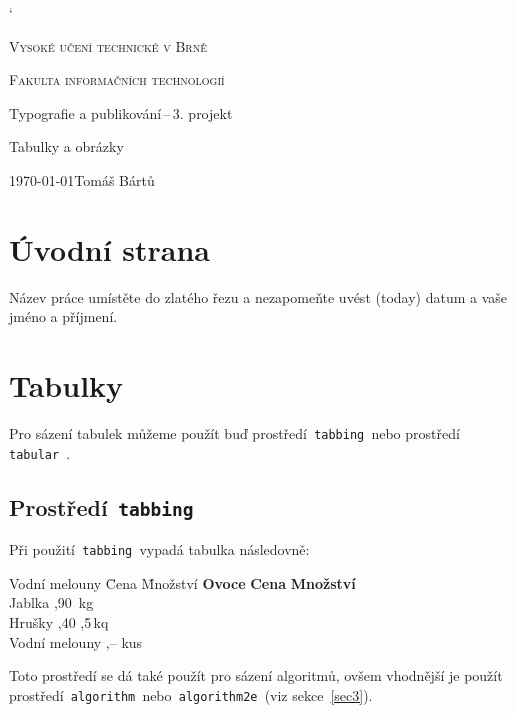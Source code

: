 \documentclass[a4paper,11pt]{article}[20-03-2022]
\begin{document}
\catcode`
\color{red}
\begin{titlepage}
    \begin{center}
        \Huge \textsc{Vysoké učení technické v Brně}

        \huge \textsc{Fakulta informačních technologií}


        \LARGE Typografie a publikování\,--\,3. projekt

        \Huge Tabulky a obrázky

    \end{center}
    {\Large \today \hfill Tomáš Bártů}    
\end{titlepage}

\section{Úvodní strana}
Název práce umístěte do zlatého řezu a nezapomeňte uvést     (today) datum a vaše jméno a příjmení.

\section{Tabulky}
Pro sázení tabulek můžeme použít buď prostředí\texttt{ tabbing }nebo prostředí\texttt{ tabular }.

\subsection{Prostředí\texttt{ tabbing }}
Při použití\texttt{ tabbing }vypadá tabulka následovně:
\begin{tabbing}
    Vodní melouny \quad \= Cena \quad \= Množství \kill
    \textbf{Ovoce}      \> \textbf{Cena} \> \textbf{Množství}\\
    Jablka              ,90         \,kg\\
    Hrušky              ,40         ,5\,kq\\
    Vodní melouny       ,--          kus\\
\end{tabbing}
Toto prostředí se dá také použít pro sázení algoritmů, ovšem vhodnější je použít prostředí\texttt{ algorithm }nebo\texttt{ algorithm2e }(viz sekce~\ref{sec3}).
\end{document}
